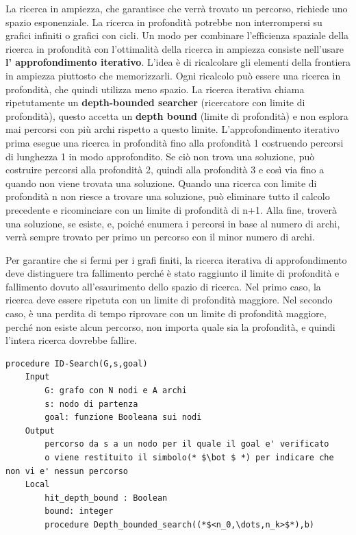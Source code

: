 \documentclass[a4paper]{extarticle}
\begin{document}
La ricerca in ampiezza, che garantisce che verrà trovato un percorso, richiede uno spazio esponenziale. La ricerca in profondità potrebbe non interrompersi su grafici infiniti o grafici con cicli. Un modo per combinare l'efficienza spaziale della ricerca in profondità con l'ottimalità della ricerca in ampiezza consiste nell'usare \textbf{l' approfondimento iterativo}. L'idea è di ricalcolare gli elementi della frontiera in ampiezza piuttosto che memorizzarli. Ogni ricalcolo può essere una ricerca in profondità, che quindi utilizza meno spazio. La ricerca iterativa chiama ripetutamente un \textbf{depth-bounded searcher} (ricercatore con limite di profondità), questo accetta un \textbf{depth bound} (limite di profondità) e non esplora mai percorsi con più archi rispetto a questo limite. L'approfondimento iterativo prima esegue una ricerca in profondità fino alla profondità 1 costruendo percorsi di lunghezza 1 in modo approfondito. Se ciò non trova una soluzione, può costruire percorsi alla profondità 2, quindi alla profondità 3 e così via fino a quando non viene trovata una soluzione. Quando una ricerca con limite di profondità n non riesce a trovare una soluzione, può eliminare tutto il calcolo precedente e ricominciare con un limite di profondità di n+1. Alla fine, troverà una soluzione, se esiste, e, poiché enumera i percorsi in base al numero di archi, verrà sempre trovato per primo un percorso con il minor numero di archi.

Per garantire che si fermi per i grafi finiti, la ricerca iterativa di approfondimento deve distinguere tra fallimento perché è stato raggiunto il limite di profondità e fallimento dovuto all'esaurimento dello spazio di ricerca. Nel primo caso, la ricerca deve essere ripetuta con un limite di profondità maggiore. Nel secondo caso, è una perdita di tempo riprovare con un limite di profondità maggiore, perché non esiste alcun percorso, non importa quale sia la profondità, e quindi l'intera ricerca dovrebbe fallire.

\begin{lstlisting}
procedure ID-Search(G,s,goal)
	Input
		G: grafo con N nodi e A archi
		s: nodo di partenza
		goal: funzione Booleana sui nodi
	Output
		percorso da s a un nodo per il quale il goal e' verificato 
		o viene restituito il simbolo(* $\bot $ *) per indicare che non vi e' nessun percorso
	Local
		hit_depth_bound : Boolean
		bound: integer
		procedure Depth_bounded_search((*$<n_0,\dots,n_k>$*),b)
\end{lstlisting}
\end{document}
